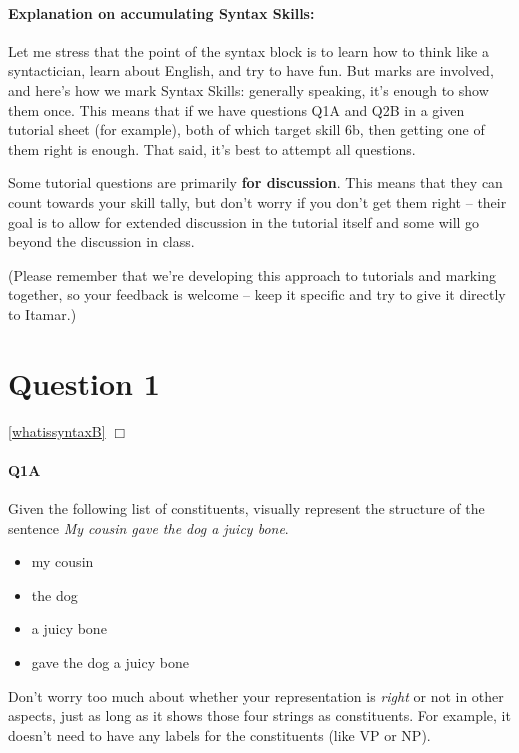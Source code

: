 \documentclass{article}
\begin{document}
\pagestyle{empty}
\maketitle
\subtitle{Tutorial Week 5: Topics 1, 2 \& 3}

\paragraph{Explanation on accumulating Syntax Skills:} Let me stress that the point of the syntax block is to learn how to think like a syntactician, learn about English, and try to have fun. But marks are involved, and here's how we mark Syntax Skills: generally speaking, it's enough to show them once. This means that if we have questions Q1A and Q2B in a given tutorial sheet (for example), both of which target skill 6b, then getting one of them right is enough. That said, it's best to attempt all questions.

Some tutorial questions are primarily \textbf{for discussion}. This means that they can count towards your skill tally, but don't worry if you don't get them right -- their goal is to allow for extended discussion in the tutorial itself and some will go beyond the discussion in class.

(Please remember that we're developing this approach to tutorials and marking together, so your feedback is welcome -- keep it specific and try to give it directly to Itamar.)

\section*{Question 1}
\hfill{}
\ref{whatissyntaxB} $\Box$ 

\paragraph{Q1A} Given the following list of constituents, visually represent the structure of the sentence \emph{My cousin gave the dog a juicy bone}.
\begin{itemize}
    \item my cousin
    \item the dog
    \item a juicy bone
    \item gave the dog a juicy bone
\end{itemize}
Don’t worry too much about whether your representation is \emph{right} or not in other aspects, just as long as it
shows those four strings as constituents. For example, it doesn't need to have any labels for the constituents (like VP or NP).
\end{document}
